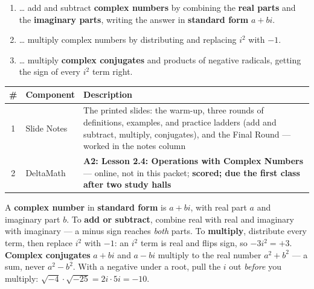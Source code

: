 \documentclass[12pt]{article}
\begin{document}

\namedateperiod
\vspace{0.18in}

\boxguard[14]
\begin{learningtargetbox}
\small
\begin{enumerate}[leftmargin=1.5em, itemsep=5pt]
  \item \ldots{} add and subtract \textbf{complex numbers} by combining the \textbf{real parts}
        and the \textbf{imaginary parts}, writing the answer in \textbf{standard form} $a+bi$.
  \item \ldots{} multiply complex numbers by distributing and replacing $i^2$ with $-1$.
  \item \ldots{} multiply \textbf{complex conjugates} and products of negative radicals, getting
        the sign of every $i^2$ term right.
\end{enumerate}
\end{learningtargetbox}

\vspace{0.14in}

\boxguard[14]
\begin{tocbox}
\small
\renewcommand{\arraystretch}{1.5}
\begin{tabularx}{\linewidth}{@{} c l X @{}}
\rowcolor{forestbg}
\textbf{\#} & \textbf{Component} & \textbf{Description} \\
\midrule
1 & Slide Notes & The printed slides: the warm-up, three rounds of definitions, examples, and
                  practice ladders (add and subtract, multiply, conjugates), and the Final
                  Round --- worked in the notes column \\
2 & DeltaMath   & \textbf{A2: Lesson 2.4: Operations with Complex Numbers} --- online, not in this
                  packet; \textbf{scored; due the first class after two study halls} \\
\end{tabularx}
\end{tocbox}

\vspace{0.14in}

\boxguard[8]
\begin{remindbox}
\small
A \textbf{complex number} in \textbf{standard form} is $a+bi$, with real part $a$ and imaginary
part $b$. To \textbf{add or subtract}, combine real with real and imaginary with imaginary --- a
minus sign reaches \emph{both} parts. To \textbf{multiply}, distribute every term, then replace
$i^2$ with $-1$: an $i^2$ term is real and flips sign, so $-3i^2=+3$. \textbf{Complex
conjugates} $a+bi$ and $a-bi$ multiply to the real number $a^2+b^2$ --- a sum, never
$a^2-b^2$. With a negative under a root, pull the $i$ out \emph{before} you multiply:
$\sqrt{-4}\cdot\sqrt{-25}=2i\cdot5i=-10$.
\end{remindbox}
\end{document}
